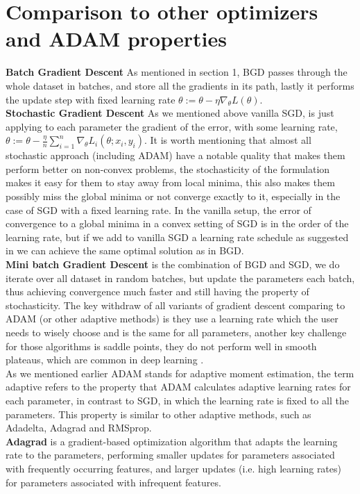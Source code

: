 \documentclass[10pt,a4paper]{article}
\begin{document}
\section{Comparison to other optimizers and ADAM properties}
\textbf{Batch Gradient Descent} As mentioned in section 1, BGD passes through the whole dataset in batches, and store all the gradients in its path, lastly it performs the update step with fixed learning rate $\theta:=\theta-\eta \nabla_\theta L(\theta)$. \\
\textbf{Stochastic Gradient Descent} As we mentioned above vanilla SGD, is just applying to each parameter the gradient of the error, with some learning rate, $\theta:=\theta-\frac{\eta}{n}\sum_{i=1}^{n}\nabla_\theta L_i(\theta;x_i,y_i)$. It is worth mentioning that almost all stochastic approach (including ADAM) have a notable quality that makes them perform better on non-convex problems, the stochasticity of the formulation makes it easy for them to stay away from local minima, this also makes them possibly miss the global minima or not converge exactly to it, especially in the case of SGD with a fixed learning rate. In the vanilla setup, the error of convergence to a global minima in a convex setting of SGD is in the order of the learning rate, but if we add to vanilla SGD a learning rate schedule as suggested in \cite{darken1992learning} we can achieve the same optimal solution as in BGD.\\
\textbf{Mini batch Gradient Descent} is the combination of BGD and SGD, we do iterate over all dataset in random batches, but update the parameters each batch, thus achieving convergence much faster and still having the property of stochasticity.
The key withdraw of all variants of gradient descent comparing to ADAM (or other adaptive methods) is they use a learning rate which the user needs to wisely choose and is the same for all parameters, another key challenge for those algorithms is saddle points, they do not perform well in smooth plateaus, which are common in deep learning \cite{dauphin2014identifying}.\\
As we mentioned earlier ADAM stands for adaptive moment estimation, the term adaptive refers to the property that ADAM calculates adaptive learning rates for each parameter, in contrast to SGD, in which the learning rate is fixed to all the parameters. This property is similar to other adaptive methods, such as Adadelta, Adagrad and RMSprop.\\
\textbf{Adagrad} is a gradient-based optimization algorithm that adapts the learning rate to the parameters, performing smaller updates for parameters associated with frequently occurring features, and larger updates (i.e. high learning rates) for parameters associated with infrequent features.\\
\end{document}
